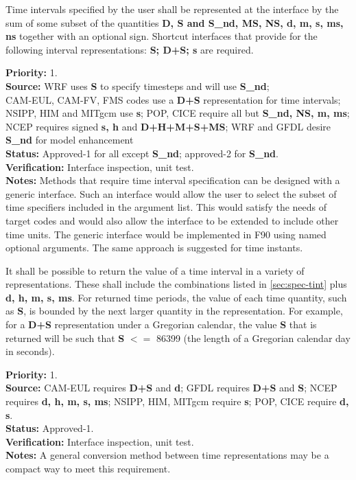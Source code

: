 

\label{req:tp_tv}

\label{req:spec-tint}
Time intervals specified by the user shall be represented at the interface by the 
sum of some subset of the quantities {\bf D, S and S\_nd, MS, NS, d, m, s, ms, ns}
together with an optional sign.  Shortcut interfaces that provide for the following 
interval representations: {\bf S; D+S; s} are required.  

\begin{reqlist}
{\bf Priority:} 1. \\
{\bf Source:} WRF uses {\bf S} to specify timesteps and will use {\bf S\_nd}; \\
CAM-EUL, CAM-FV, FMS codes use a {\bf D+S} representation for time intervals; 
NSIPP, HIM and MITgcm use {\bf s}; 
POP, CICE require all but {\bf S\_nd, NS, m, ms};
NCEP requires signed {\bf s, h} and {\bf D+H+M+S+MS};
WRF and GFDL desire {\bf S\_nd} for model enhancement \\
{\bf Status:} Approved-1 for all except {\bf S\_nd}; 
approved-2 for {\bf S\_nd}.\\
{\bf Verification:} Interface inspection, unit test. \\
{\bf Notes:} Methods that require time interval specification can be designed with 
a generic interface.  Such an interface would allow the user to select the subset of
time specifiers included in the argument list.  This would satisfy the needs of 
target codes and would also allow the interface to be extended to include other 
time units.  The generic interface would be implemented in F90 using named optional 
arguments.  The same approach is suggested for time instants. 
\end{reqlist}

\label{sec:query-tinterval}
It shall be possible to return the value of a time interval in a variety of 
representations.  These shall include the combinations listed in \ref{sec:spec-tint}
plus {\bf d, h, m, s, ms}. For returned time periods, the value of each time quantity, 
such as {\bf S}, is bounded by the next larger quantity in the representation.  For 
example, for a {\bf D+S} representation under a Gregorian calendar, the value {\bf S} that is 
returned will be such that {\bf S} $<=$ 86399 (the length of a Gregorian calendar day in
seconds).
\begin{reqlist}
{\bf Priority:} 1. \\
{\bf Source:} CAM-EUL requires {\bf D+S} and {\bf d}; 
GFDL requires {\bf D+S} and {\bf S};
NCEP requires {\bf d, h, m, s, ms};
NSIPP, HIM, MITgcm require {\bf s};
POP, CICE require {\bf d, s}. \\
{\bf Status:} Approved-1. \\
{\bf Verification:} Interface inspection, unit test. \\
{\bf Notes:} A general conversion method between time representations may be a compact 
way to meet this requirement.
\end{reqlist}


